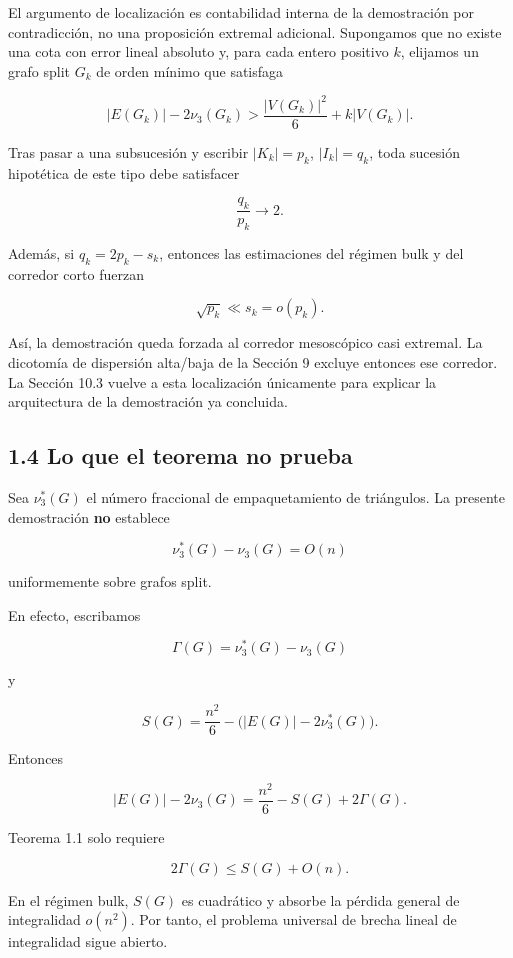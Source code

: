 \documentclass[
  spanish,
  11pt,
  a4paper,
]{article}
\begin{document}
El argumento de localización es contabilidad interna de la demostración por contradicción, no una proposición extremal adicional. Supongamos que no existe una cota con error lineal absoluto y, para cada entero positivo \(k\), elijamos un grafo split \(G_k\) de orden mínimo que satisfaga

\[
|E(G_k)|-2\nu_3(G_k)>\frac{|V(G_k)|^2}{6}+k|V(G_k)|.
\]

Tras pasar a una subsucesión y escribir \(|K_k|=p_k\), \(|I_k|=q_k\), toda sucesión hipotética de este tipo debe satisfacer

\[
\frac{q_k}{p_k}\longrightarrow 2.
\]

Además, si \(q_k=2p_k-s_k\), entonces las estimaciones del régimen bulk y del corredor corto fuerzan

\[
\sqrt{p_k}\ll s_k=o(p_k).
\]

Así, la demostración queda forzada al corredor mesoscópico casi extremal. La dicotomía de dispersión alta/baja de la Sección 9 excluye entonces ese corredor. La Sección 10.3 vuelve a esta localización únicamente para explicar la arquitectura de la demostración ya concluida.

\subsection{1.4 Lo que el teorema no prueba}\label{lo-que-el-teorema-no-prueba}

Sea \(\nu_3^*(G)\) el número fraccional de empaquetamiento de triángulos. La presente demostración \textbf{no} establece

\[
\nu_3^*(G)-\nu_3(G)=O(n)
\tag{1.4}
\]

uniformemente sobre grafos split.

En efecto, escribamos

\[
\Gamma(G)=\nu_3^*(G)-\nu_3(G)
\]

y

\[
S(G)=\frac{n^2}{6}-\bigl(|E(G)|-2\nu_3^*(G)\bigr).
\]

Entonces

\[
|E(G)|-2\nu_3(G)
=
\frac{n^2}{6}-S(G)+2\Gamma(G).
\tag{1.5}
\]

Teorema 1.1 solo requiere

\[
2\Gamma(G)\le S(G)+O(n).
\]

En el régimen bulk, \(S(G)\) es cuadrático y absorbe la pérdida general de integralidad \(o(n^2)\). Por tanto, el problema universal de brecha lineal de integralidad sigue abierto.
\end{document}
